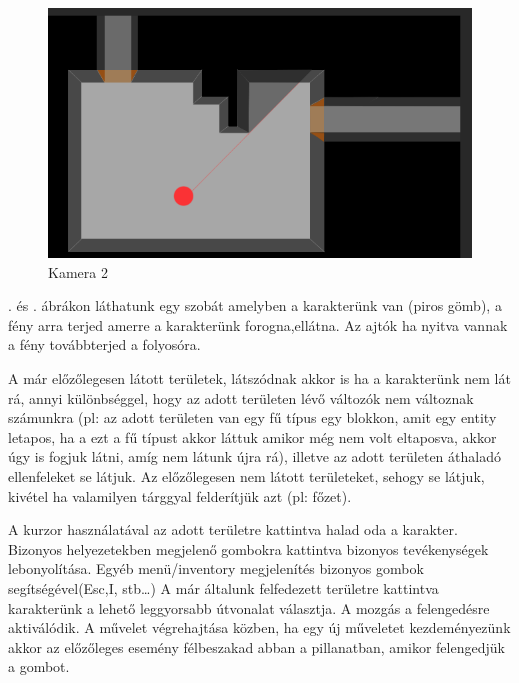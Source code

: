 \begin{figure}[h!]
	\centering
	\includegraphics[scale=1]{images/image7.png}
	\caption{Kamera 2}
	\label{fig:camera2}
\end{figure}

. és . ábrákon láthatunk egy szobát amelyben a karakterünk van (piros gömb), a fény arra terjed amerre a karakterünk forogna,ellátna.
Az ajtók ha nyitva vannak a fény továbbterjed a folyosóra.

A már előzőlegesen látott területek, látszódnak akkor is ha a karakterünk nem lát rá, annyi különbséggel, hogy az adott területen lévő változók nem változnak számunkra (pl: az adott területen van egy fű típus egy blokkon, amit egy entity letapos, ha a ezt a fű típust akkor láttuk amikor még nem volt eltaposva, akkor úgy is fogjuk látni, amíg nem látunk újra rá), illetve az adott területen áthaladó ellenfeleket se látjuk.
Az előzőlegesen nem látott területeket, sehogy se látjuk, kivétel ha valamilyen tárggyal felderítjük azt (pl: főzet).




A kurzor használatával az adott területre kattintva halad oda a karakter.
Bizonyos helyezetekben megjelenő gombokra kattintva bizonyos tevékenységek lebonyolítása.
Egyéb menü/inventory megjelenítés bizonyos gombok segítségével(Esc,I, stb…)
A már általunk felfedezett területre kattintva karakterünk a lehető leggyorsabb útvonalat választja.
A mozgás a felengedésre aktiválódik.
A művelet végrehajtása közben, ha egy új műveletet kezdeményezünk akkor az előzőleges esemény félbeszakad abban a pillanatban, amikor felengedjük a gombot.

